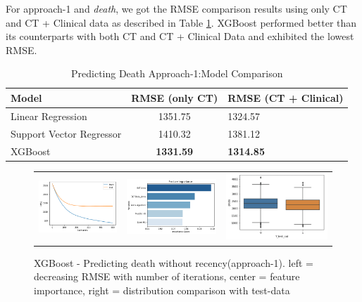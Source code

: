 For approach-1 and \textit{death}, we got the RMSE comparison results using only CT and CT + Clinical data as described in Table \ref{tab:death_approach_1}. XGBoost performed better than its counterparts with both CT and CT + Clinical Data and exhibited the lowest RMSE. 
\begin{table}[H]
\centering
\begin{tabular}{|l|c|l|}
\hline
\textbf{Model}           & \textbf{RMSE (only CT)} & \textbf{RMSE (CT + Clinical)} \\ \hline
Linear Regression        & 1351.75                 & 1324.57                       \\ \hline
Support Vector Regressor & 1410.32                 & 1381.12                       \\ \hline
XGBoost                  & \textbf{1331.59}                 & \textbf{1314.85}                       \\ \hline
\end{tabular}
\caption{Predicting Death Approach-1:Model Comparison}
\label{tab:death_approach_1}
\end{table}

\begin{figure}[H]
	\def\imgwidth{0.5\linewidth}
	\centering
	\begin{tabular}{ccc}
		\includegraphics[width=0.3\linewidth]{images/death/a_1_comp_rmse.png} &
		\includegraphics[width=0.3\linewidth]{images/death/a_1_comp_feat_imp.png} &
		\includegraphics[width=0.3\linewidth]{images/death/a_1_comp_w_test.png} \\
	\end{tabular}
	\caption{XGBoost - Predicting death without recency(approach-1). left = decreasing RMSE with number of iterations, center = feature importance, right = distribution comparison with test-data}
	\label{fig:death_results_a_1}
\end{figure}



